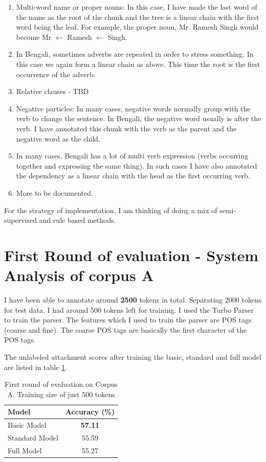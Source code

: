\documentclass[11pt,letterpaper]{article}
\begin{document}
\begin{enumerate}
\item Multi-word name or proper nouns: In this case, I have made the last word of the name as the root of the chunk and the tree is a linear chain with the first word being the leaf. For example, the proper noun, Mr. Ramesh Singh would become Mr $\leftarrow$ Ramesh $\leftarrow$ Singh.
\item In Bengali, sometimes adverbs are repeated in order to stress something. In this case we again form a linear chain as above. This time the root is the first occurrence of the adverb.
\item Relative clauses - TBD
\item Negative particles: In many cases, negative words normally group with the verb to change the sentence. In Bengali, the negative word usually is after the verb. I have annotated this chunk with the verb as the parent and the negative word as the child.
\item In many cases, Bengali has a lot of multi verb expression (verbs occurring together and expressing the same thing). In such cases I have also annotated the dependency as a linear chain with the head as the first occurring verb.
\item More to be documented.
\end{enumerate}

For the strategy of implementation, I am thinking of doing a  mix of semi-supervised and rule based methods.

\section{First Round of evaluation - System Analysis of corpus A}
I have been able to annotate around \textbf{2500} tokens in total. Separating 2000 tokens for test data, I had around 500 tokens left for training. I used the Turbo Parser \citep{MSXAF10} to train the parser. The features which I used to train the parser are POS tags (coarse and fine). The coarse POS tags are basically the first character of the POS tags. 

 The unlabeled attachment scores after training the basic, standard and full model are listed in table \ref{First}.
\begin{table}
\begin{center}
  \begin{tabular}{ l || c }
  \hline
  Model & Accuracy (\%)\\
  \hline
  Basic Model & \textbf{57.11} \\
  Standard Model & 55.59 \\
  Full Model & 55.27 \\
  \hline
   \end{tabular}
\end{center}
\caption{First round of evaluation on Corpus A. Training size of just 500 tokens}
\label{First}
\end{table}
\end{document}
